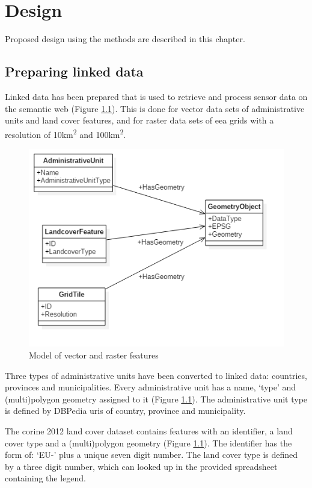 

\chapter{Design}
\label{chap:impl}

Proposed design using the methods are described in this chapter.

\section{Preparing linked data}
Linked data has been prepared that is used to retrieve and process sensor data on the semantic web (Figure \ref*{fig:Static}). This is done for vector data sets of administrative units and land cover features, and for raster data sets of \ac{eea} grids with a resolution of 10km\textsuperscript{2} and 100km\textsuperscript{2}. 

\begin{figure}
	\includegraphics[width=0.7\linewidth]{UML/staticdata2.PNG}
	\caption{Model of vector and raster features}
	\label{fig:Static}
\end{figure}


Three types of administrative units have been converted to linked data: countries, provinces and municipalities. Every administrative unit has a name, `type' and (multi)polygon geometry assigned to it (Figure \ref{fig:Static}). The administrative unit type is defined by DBPedia \ac{uri}s of country, province and municipality. 

The \ac{corine} 2012 land cover dataset contains features with an identifier, a land cover type and a (multi)polygon geometry (Figure \ref{fig:Static}). The identifier has the form of: `EU-' plus a unique seven digit number. The land cover type is defined by a three digit number, which can looked up in the provided spreadsheet containing the legend.    

